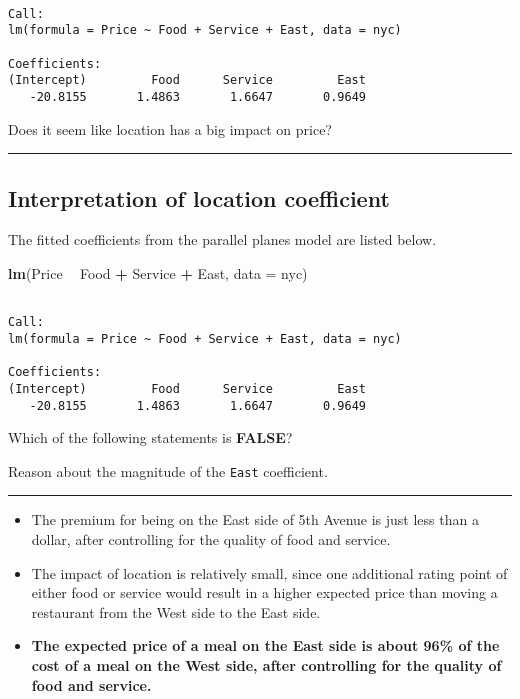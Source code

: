 \documentclass[
]{book}
\newenvironment{Shaded}{\begin{snugshade}}{\end{snugshade}}
\newcommand{\DataTypeTok}[1]{\textcolor[rgb]{0.13,0.29,0.53}{#1}}
\newcommand{\KeywordTok}[1]{\textcolor[rgb]{0.13,0.29,0.53}{\textbf{#1}}}
\newcommand{\NormalTok}[1]{#1}
\newcommand{\OperatorTok}[1]{\textcolor[rgb]{0.81,0.36,0.00}{\textbf{#1}}}
\newcommand{\StringTok}[1]{\textcolor[rgb]{0.31,0.60,0.02}{#1}}
\begin{document}
\begin{verbatim}

Call:
lm(formula = Price ~ Food + Service + East, data = nyc)

Coefficients:
(Intercept)         Food      Service         East  
   -20.8155       1.4863       1.6647       0.9649  
\end{verbatim}

Does it seem like location has a big impact on price?

\begin{center}\rule{0.5\linewidth}{0.5pt}\end{center}

\hypertarget{interpretation-of-location-coefficient}{%
\subsection*{Interpretation of location coefficient}\label{interpretation-of-location-coefficient}}

The fitted coefficients from the parallel planes model are listed below.

\begin{Shaded}
\begin{Highlighting}[]
\KeywordTok{lm}\NormalTok{(Price }\OperatorTok{~}\StringTok{ }\NormalTok{Food }\OperatorTok{+}\StringTok{ }\NormalTok{Service }\OperatorTok{+}\StringTok{ }\NormalTok{East, }\DataTypeTok{data =}\NormalTok{ nyc)}
\end{Highlighting}
\end{Shaded}

\begin{verbatim}

Call:
lm(formula = Price ~ Food + Service + East, data = nyc)

Coefficients:
(Intercept)         Food      Service         East  
   -20.8155       1.4863       1.6647       0.9649  
\end{verbatim}

Which of the following statements is \textbf{FALSE}?

Reason about the magnitude of the \texttt{East} coefficient.

\begin{center}\rule{0.5\linewidth}{0.5pt}\end{center}

\begin{itemize}
\item
  The premium for being on the East side of 5th Avenue is just less than a dollar, after controlling for the quality of food and service.
\item
  The impact of location is relatively small, since one additional rating point of either food or service would result in a higher expected price than moving a restaurant from the West side to the East side.
\item
  \textbf{The expected price of a meal on the East side is about 96\% of the cost of a meal on the West side, after controlling for the quality of food and service.}
\end{itemize}
\end{document}
